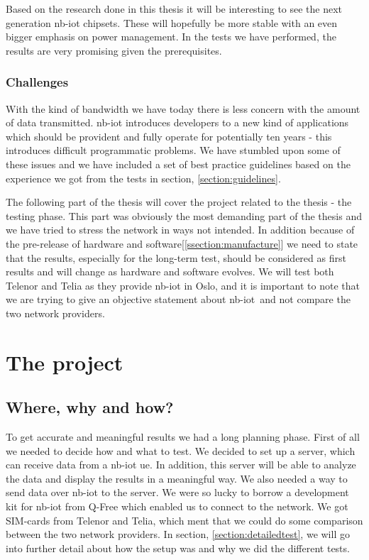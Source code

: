 \documentclass[USenglish]{ifimaster}  %
\begin{document}
Based on the research done in this thesis it will be interesting to see the next generation \acrshort{nb-iot} chipsets. These will hopefully be more stable with an even bigger emphasis on power management. In the tests we have performed, the results are very promising given the prerequisites.

\section{Challenges} \label{section:challenges}
With the kind of bandwidth we have today there is less concern with the amount of data transmitted. \acrshort{nb-iot} introduces developers to a new kind of applications which should be provident and fully operate for potentially ten years - this introduces difficult programmatic problems. We have stumbled upon some of these issues and we have included a set of best practice guidelines based on the experience we got from the tests in section, \vref{section:guidelines}.

The following part of the thesis will cover the project related to the thesis - the testing phase. This part was obviously the most demanding part of the thesis and we have tried to stress the network in ways not intended. In addition because of the pre-release of hardware and software[\ref{ssection:manufacture}] we need to state that the results, especially for the long-term test, should be considered as first results and will change as hardware and software evolves. We will test both Telenor and Telia as they provide \acrshort{nb-iot} in Oslo, and it is important to note that we are trying to give an objective statement about \acrshort{nb-iot} and not compare the two network providers.

\part{The project}
\chapter{Where, why and how?} \label{chapter:wherewhynhow}
To get accurate and meaningful results we had a long planning phase. First of all we needed to decide how and what to test. We decided to set up a server, which can receive data from a \acrshort{nb-iot} \acrshort{ue}. In addition, this server will be able to analyze the data and display the results in a meaningful way. We also needed a way to send data over \acrshort{nb-iot} to the server. We were so lucky to borrow a development kit for \acrshort{nb-iot} from Q-Free which enabled us to connect to the network. We got SIM-cards from Telenor and Telia, which ment that we could do some comparison between the two network providers. In section, \vref{section:detailedtest}, we will go into further detail about how the setup was and why we did the different tests.
\end{document}
